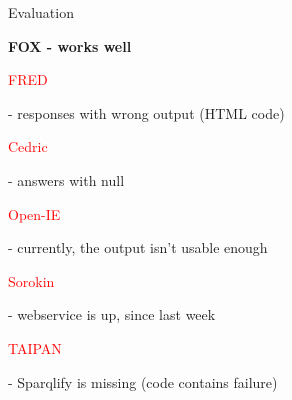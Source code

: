 \begin{frame}{Evaluation}
	\begin{itemize}
		\item \textbf{FOX - works well}
		\textcolor{red}{\item FRED} - responses with wrong output (HTML code)
			\textcolor{red}{\item Cedric} - answers with null
			\textcolor{red}{\item Open-IE} - currently, the output isn't usable enough
			\textcolor{red}{\item Sorokin} - webservice is up, since last week
			\textcolor{red}{\item TAIPAN} - Sparqlify is missing (code contains failure)
	\end{itemize}

\end{frame}